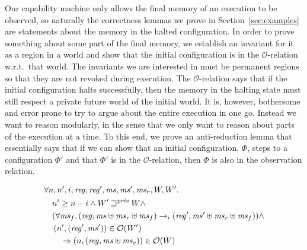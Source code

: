 \documentclass[format=acmsmall, review=true, screen=true]{acmart}
\renewcommand{\sectionname}{Section}
\newcommand{\var}[1]{\mathit{#1}}
\newcommand{\hs}{\var{ms}}
\newcommand{\ms}{\hs}
\newcommand{\reg}{\var{reg}}
\newcommand{\futurestr}{\mathbin{\sqsupseteq}^{\var{priv}}}
\newcommand{\observations}{\mathcal{O}}
\newcommand{\npair}[2][n]{\left(#1,#2 \right)}
\newcommand{\step}[1][]{\rightarrow_{#1}}
\newenvironment{toplas}%
    {\color{OliveGreen}}{}
\begin{document}
\begin{toplas}
Our capability machine only allows the final memory of an execution to be observed, so naturally the correctness lemmas we prove in \sectionname~\ref{sec:examples} are statements about the memory in the halted configuration.
In order to prove something about some part of the final memory, we establish an invariant for it as a region in a world and show that the initial configuration is in the $\observations$-relation w.r.t.\ that world.
The invariants we are interested in must be permanent regions so that they are not revoked during execution.
The $\observations$-relation says that if the initial configuration halts successfully, then the memory in the halting state must still respect a private future world of the initial world.
It is, however, bothersome and error prone to try to argue about the entire execution in one go.
Instead we want to reason modularly, in the sense that we only want to reason about parts of the execution at a time.
To this end, we prove an anti-reduction lemma that essentially says that if we can show that an initial configuration, $\Phi$, steps to a configuration $\Phi'$ and that $\Phi'$ is in the $\observations$-relation, then $\Phi$ is also in the observation relation.
\begin{lemma}[Anti-reduction for $\observations$]
\label{lem:anti-red-obs}
  \begin{align*}
    & \forall n, n',i,\reg, \reg', \ms, \ms', \ms_r, W, W' \ldotp\\
    & \quad n' \geq n - i \land W' \futurestr W \land \\
    & \quad (\forall \ms_f \ldotp (\reg,\ms \uplus \ms_r \uplus \ms_f) \step[i] (\reg',\ms' \uplus \ms_r \uplus \ms_f)) \land \\
    & \quad \npair[n']{(\reg',\ms')} \in \observations(W') \\
    & \qquad \Rightarrow \npair{(\reg,\ms \uplus \ms_r)} \in \observations(W)
  \end{align*}
\end{lemma}


\end{toplas}
\end{document}
